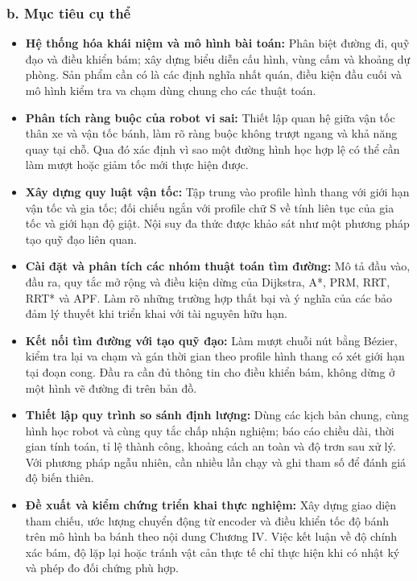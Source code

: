 \documentclass[12pt,a4paper,oneside]{report}
\begin{document}
\subsubsection*{b. Mục tiêu cụ thể}

\begin{itemize}
  \item \textbf{Hệ thống hóa khái niệm và mô hình bài toán:} Phân biệt đường đi, quỹ đạo và điều khiển bám; xây dựng biểu diễn cấu hình, vùng cấm và khoảng dự phòng. Sản phẩm cần có là các định nghĩa nhất quán, điều kiện đầu cuối và mô hình kiểm tra va chạm dùng chung cho các thuật toán.
  \item \textbf{Phân tích ràng buộc của robot vi sai:} Thiết lập quan hệ giữa vận tốc thân xe và vận tốc bánh, làm rõ ràng buộc không trượt ngang và khả năng quay tại chỗ. Qua đó xác định vì sao một đường hình học hợp lệ có thể cần làm mượt hoặc giảm tốc mới thực hiện được.
  \item \textbf{Xây dựng quy luật vận tốc:} Tập trung vào profile hình thang với giới hạn vận tốc và gia tốc; đối chiếu ngắn với profile chữ S về tính liên tục của gia tốc và giới hạn độ giật. Nội suy đa thức được khảo sát như một phương pháp tạo quỹ đạo liên quan.
  \item \textbf{Cài đặt và phân tích các nhóm thuật toán tìm đường:} Mô tả đầu vào, đầu ra, quy tắc mở rộng và điều kiện dừng của Dijkstra, A*, PRM, RRT, RRT* và APF. Làm rõ những trường hợp thất bại và ý nghĩa của các bảo đảm lý thuyết khi triển khai với tài nguyên hữu hạn.
  \item \textbf{Kết nối tìm đường với tạo quỹ đạo:} Làm mượt chuỗi nút bằng Bézier, kiểm tra lại va chạm và gán thời gian theo profile hình thang có xét giới hạn tại đoạn cong. Đầu ra cần đủ thông tin cho điều khiển bám, không dừng ở một hình vẽ đường đi trên bản đồ.
  \item \textbf{Thiết lập quy trình so sánh định lượng:} Dùng các kịch bản chung, cùng hình học robot và cùng quy tắc chấp nhận nghiệm; báo cáo chiều dài, thời gian tính toán, tỉ lệ thành công, khoảng cách an toàn và độ trơn sau xử lý. Với phương pháp ngẫu nhiên, cần nhiều lần chạy và ghi tham số để đánh giá độ biến thiên.
  \item \textbf{Đề xuất và kiểm chứng triển khai thực nghiệm:} Xây dựng giao diện tham chiếu, ước lượng chuyển động từ encoder và điều khiển tốc độ bánh trên mô hình ba bánh theo nội dung Chương IV. Việc kết luận về độ chính xác bám, độ lặp lại hoặc tránh vật cản thực tế chỉ thực hiện khi có nhật ký và phép đo đối chứng phù hợp.
\end{itemize}
\end{document}
